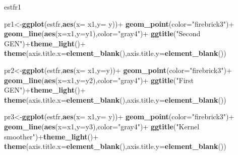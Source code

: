 \documentclass[12pt,twoside, a4paper]{reedthesis}
\newenvironment{Shaded}{}{}
\newcommand{\DataTypeTok}[1]{\textcolor[rgb]{0.56,0.13,0.00}{#1}}
\newcommand{\KeywordTok}[1]{\textcolor[rgb]{0.00,0.44,0.13}{\textbf{#1}}}
\newcommand{\NormalTok}[1]{#1}
\newcommand{\OperatorTok}[1]{\textcolor[rgb]{0.40,0.40,0.40}{#1}}
\newcommand{\StringTok}[1]{\textcolor[rgb]{0.25,0.44,0.63}{#1}}
\begin{document}
\begin{Shaded}
\begin{Highlighting}[]
{\NormalTok{estfr1 }\OperatorTok{%>%}\StringTok{ }\KeywordTok{ggplot}\NormalTok{(}\KeywordTok{aes}\NormalTok{(}\DataTypeTok{x=}\NormalTok{x1,}\DataTypeTok{y=}\NormalTok{para,}\DataTypeTok{color=}\NormalTok{t,}\DataTypeTok{group=}\NormalTok{t))}\OperatorTok{+}\KeywordTok{geom_line}\NormalTok{()}\OperatorTok{+}\KeywordTok{theme_light}\NormalTok{()}\OperatorTok{+}\KeywordTok{theme}\NormalTok{(}\DataTypeTok{axis.title.x=}\KeywordTok{element_blank}\NormalTok{(),}\DataTypeTok{axis.title.y=}\KeywordTok{element_blank}\NormalTok{())}



\NormalTok{pr1<-}\KeywordTok{ggplot}\NormalTok{(estfr,}\KeywordTok{aes}\NormalTok{(}\DataTypeTok{x=}\NormalTok{ x1,}\DataTypeTok{y=}\NormalTok{ y))}\OperatorTok{+}
\StringTok{  }\KeywordTok{geom_point}\NormalTok{(}\DataTypeTok{color=}\StringTok{"firebrick3"}\NormalTok{)}\OperatorTok{+}
\StringTok{  }\KeywordTok{geom_line}\NormalTok{(}\KeywordTok{aes}\NormalTok{(}\DataTypeTok{x=}\NormalTok{x1,}\DataTypeTok{y=}\NormalTok{y1),}\DataTypeTok{color=}\StringTok{"gray4"}\NormalTok{)}\OperatorTok{+}
\StringTok{  }\KeywordTok{ggtitle}\NormalTok{(}\StringTok{"Second GEN"}\NormalTok{)}\OperatorTok{+}\KeywordTok{theme_light}\NormalTok{()}\OperatorTok{+}\StringTok{ }\KeywordTok{theme}\NormalTok{(}\DataTypeTok{axis.title.x=}\KeywordTok{element_blank}\NormalTok{(),}\DataTypeTok{axis.title.y=}\KeywordTok{element_blank}\NormalTok{())}


\NormalTok{pr2<-}\KeywordTok{ggplot}\NormalTok{(estfr,}\KeywordTok{aes}\NormalTok{(}\DataTypeTok{x=}\NormalTok{ x1,}\DataTypeTok{y=}\NormalTok{y))}\OperatorTok{+}
\StringTok{  }\KeywordTok{geom_point}\NormalTok{(}\DataTypeTok{color=}\StringTok{"firebrick3"}\NormalTok{)}\OperatorTok{+}
\StringTok{  }\KeywordTok{geom_line}\NormalTok{(}\KeywordTok{aes}\NormalTok{(}\DataTypeTok{x=}\NormalTok{x1,}\DataTypeTok{y=}\NormalTok{y2),}\DataTypeTok{color=}\StringTok{"gray4"}\NormalTok{)}\OperatorTok{+}
\StringTok{  }\KeywordTok{ggtitle}\NormalTok{(}\StringTok{"First GEN"}\NormalTok{)}\OperatorTok{+}\KeywordTok{theme_light}\NormalTok{()}\OperatorTok{+}\StringTok{ }\KeywordTok{theme}\NormalTok{(}\DataTypeTok{axis.title.x=}\KeywordTok{element_blank}\NormalTok{(),}\DataTypeTok{axis.title.y=}\KeywordTok{element_blank}\NormalTok{())}

\NormalTok{pr3<-}\KeywordTok{ggplot}\NormalTok{(estfr,}\KeywordTok{aes}\NormalTok{(}\DataTypeTok{x=}\NormalTok{ x1,}\DataTypeTok{y=}\NormalTok{ y))}\OperatorTok{+}
\StringTok{  }\KeywordTok{geom_point}\NormalTok{(}\DataTypeTok{color=}\StringTok{"firebrick3"}\NormalTok{)}\OperatorTok{+}
\StringTok{  }\KeywordTok{geom_line}\NormalTok{(}\KeywordTok{aes}\NormalTok{(}\DataTypeTok{x=}\NormalTok{x1,}\DataTypeTok{y=}\NormalTok{y3),}\DataTypeTok{color=}\StringTok{"gray4"}\NormalTok{)}\OperatorTok{+}
\StringTok{  }\KeywordTok{ggtitle}\NormalTok{(}\StringTok{"Kernel smoother"}\NormalTok{)}\OperatorTok{+}\KeywordTok{theme_light}\NormalTok{()}\OperatorTok{+}\StringTok{ }\KeywordTok{theme}\NormalTok{(}\DataTypeTok{axis.title.x=}\KeywordTok{element_blank}\NormalTok{(),}\DataTypeTok{axis.title.y=}\KeywordTok{element_blank}\NormalTok{())}

}}
\end{Highlighting}
\end{Shaded}
\end{document}
